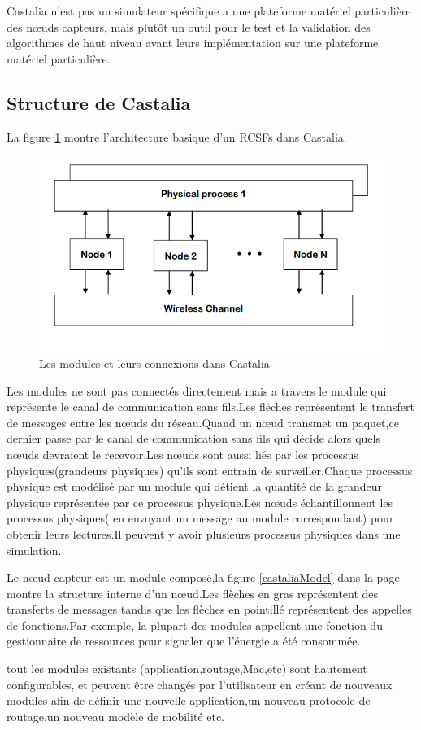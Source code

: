 Castalia n'est pas un simulateur spécifique a une plateforme matériel particulière des nœuds capteurs, mais plutôt un outil pour le test et la validation des algorithmes de haut niveau avant leurs implémentation sur une plateforme matériel particulière.
\subsection{Structure de Castalia}
La figure \ref{basicStructCastalia} montre l'architecture basique d'un RCSFs dans Castalia.
\begin{figure}[!h]
\includegraphics[scale=0.7]{basicStructCastalia}
\caption{\label{basicStructCastalia} Les modules et leurs connexions dans Castalia}
\end{figure}

Les modules ne sont pas connectés directement mais a travers le module qui représente le canal de communication sans fils.Les flèches représentent le transfert de messages entre les nœuds du réseau.Quand un nœud transmet un paquet,ce dernier passe par le canal de communication sans fils qui décide alors quels nœuds devraient le recevoir.Les nœuds sont aussi liés par les processus physiques(grandeurs physiques) qu'ils sont entrain de surveiller.Chaque processus physique est modélisé par un module qui détient la quantité de la grandeur physique représentée par ce processus physique.Les nœuds échantillonnent les processus physiques( en envoyant un message au module correspondant) pour obtenir leurs lectures.Il peuvent y avoir plusieurs processus physiques dans une simulation.

Le nœud capteur est un module composé,la figure \ref{castaliaModel} dans la page \pageref{castaliaModel} montre la structure interne d'un nœud.Les flèches en gras représentent des transferts de messages tandis que les flèches en pointillé représentent des appelles de fonctions.Par exemple, la plupart des modules appellent une fonction du gestionnaire de ressources pour signaler que l'énergie a été consommée.

tout les modules existants (application,routage,Mac,etc) sont hautement configurables, et peuvent être changés par l'utilisateur en créant de nouveaux modules afin de définir une nouvelle application,un nouveau protocole de routage,un nouveau modèle de mobilité etc.

